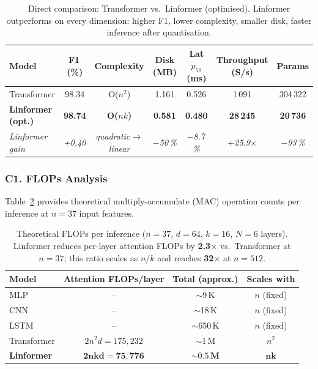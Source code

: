 \begin{table}[h]
\centering
\caption{Direct comparison: Transformer vs.\ Linformer (optimised).
Linformer outperforms on every dimension: higher F1, lower complexity,
smaller disk, faster inference after quantisation.}
\label{tab:attn_comparison}
\begin{tabular}{lcccccc}
\toprule
\textbf{Model} & \textbf{F1\,(\%)} & \textbf{Complexity} &
\textbf{Disk (MB)} & \textbf{Lat $p_{50}$ (ms)} &
\textbf{Throughput (S/s)} & \textbf{Params} \\
\midrule
Transformer          & 98.34 & O($n^2$) & 1.161 & 0.526 &  1\,091 & 304\,322 \\
\textbf{Linformer (opt.)} & \textbf{98.74} & \textbf{O($nk$)} & \textbf{0.581} & \textbf{0.480} & \textbf{28\,245} & \textbf{20\,736} \\
\midrule
\textit{Linformer gain} & \textit{+0.40} & \textit{quadratic$\to$linear} &
\textit{$-$50\,\%} & \textit{$-$8.7\,\%} & \textit{$+$25.9$\times$} & \textit{$-$93\,\%} \\
\bottomrule
\end{tabular}
\end{table}

\subsubsection{C1. FLOPs Analysis}

Table~\ref{tab:flops} provides theoretical multiply-accumulate (MAC) operation
counts per inference at $n=37$ input features.

\begin{table}[h]
\centering
\caption{Theoretical FLOPs per inference ($n=37$, $d=64$, $k=16$, $N=6$
layers). Linformer reduces per-layer attention FLOPs by \textbf{2.3$\times$}
vs.\ Transformer at $n=37$; this ratio scales as $n/k$ and reaches
\textbf{32$\times$} at $n=512$.}
\label{tab:flops}
\begin{tabular}{lccc}
\toprule
\textbf{Model} & \textbf{Attention FLOPs/layer} & \textbf{Total (approx.)} & \textbf{Scales with} \\
\midrule
MLP         & --                                  & $\sim$9\,K   & $n$ (fixed) \\
CNN         & --                                  & $\sim$18\,K  & $n$ (fixed) \\
LSTM        & --                                  & $\sim$650\,K & $n$ (fixed) \\
Transformer & $2n^2d = 175{,}232$                 & $\sim$1\,M   & $n^2$       \\
\textbf{Linformer}   & $\mathbf{2nkd = 75{,}776}$ & $\mathbf{\sim0.5\,M}$ & $\mathbf{nk}$ \\
\bottomrule
\end{tabular}
\end{table}

